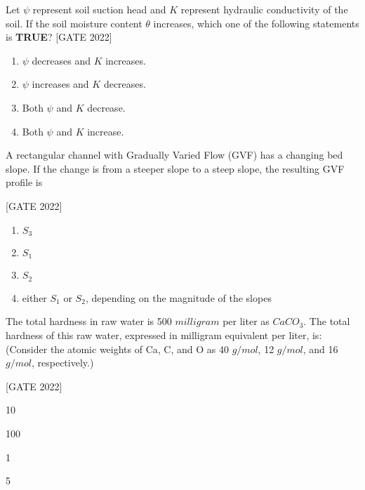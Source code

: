 \item Let  $ \psi  $ represent soil suction head and  $ K  $ represent hydraulic conductivity of the soil. If the soil moisture content  $ \theta  $ increases, which one of the following statements is \textbf{TRUE}?
\hfill{[GATE 2022]}
\begin{multicols}{2}
\begin{enumerate}
    \item  $ \psi  $ decreases and  $ K  $ increases.
    \item  $ \psi  $ increases and  $ K  $ decreases.
    \item Both  $ \psi  $ and  $ K  $ decrease.
    \item Both  $ \psi  $ and  $ K  $ increase.
\end{enumerate}
\end{multicols}

\item A rectangular channel with Gradually Varied Flow (GVF) has a changing bed slope. If the change is from a steeper slope to a steep slope, the resulting GVF profile is

\hfill{[GATE 2022]}\begin{enumerate}
    \item  $ S_3  $
    \item  $ S_1  $
    \item  $ S_2  $
    \item either  $ S_1  $ or  $ S_2  $, depending on the magnitude of the slopes
\end{enumerate}

\item The total hardness in raw water is 500 $milligram$ per liter as $CaCO_3$. The total hardness of this raw water, expressed in milligram equivalent per liter, is:\\
(Consider the atomic weights of Ca, C, and O as 40 $g/mol$, 12 $g/mol$, and 16 $g/mol$, respectively.)

\hfill{[GATE 2022]}\begin{enumerate}
    \begin{multicols}{4}
        \item 10
        \item 100
        \item 1
        \item 5
    \end{multicols}
\end{enumerate}

\vspace{1em}

